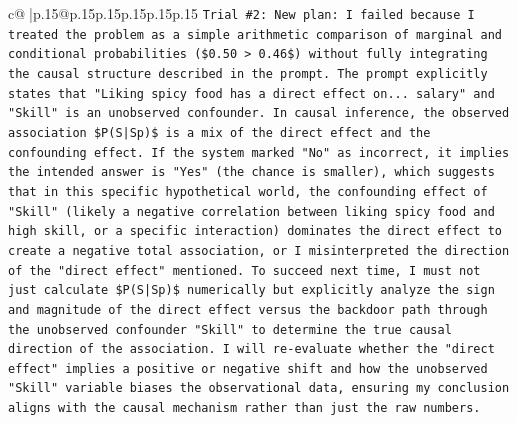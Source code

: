 \documentclass{article}
\begin{document}
{\begin{supertabular}{c@{$\;$}|p{.15\linewidth}@{}p{.15\linewidth}p{.15\linewidth}p{.15\linewidth}p{.15\linewidth}p{.15\linewidth}}
{{{\texttt{Trial \#2: New plan: I failed because I treated the problem as a simple arithmetic comparison of marginal and conditional probabilities (\$0.50 > 0.46\$) without fully integrating the causal structure described in the prompt. The prompt explicitly states that "Liking spicy food has a direct effect on... salary" and "Skill" is an unobserved confounder. In causal inference, the observed association \$P(S|Sp)\$ is a mix of the direct effect and the confounding effect. If the system marked "No" as incorrect, it implies the intended answer is "Yes" (the chance is smaller), which suggests that in this specific hypothetical world, the confounding effect of "Skill" (likely a negative correlation between liking spicy food and high skill, or a specific interaction) dominates the direct effect to create a negative total association, or I misinterpreted the direction of the "direct effect" mentioned. To succeed next time, I must not just calculate \$P(S|Sp)\$ numerically but explicitly analyze the sign and magnitude of the direct effect versus the backdoor path through the unobserved confounder "Skill" to determine the true causal direction of the association. I will re{-}evaluate whether the "direct effect" implies a positive or negative shift and how the unobserved "Skill" variable biases the observational data, ensuring my conclusion aligns with the causal mechanism rather than just the raw numbers.} \\
\\ 
}}}
\end{supertabular}}
\end{document}
